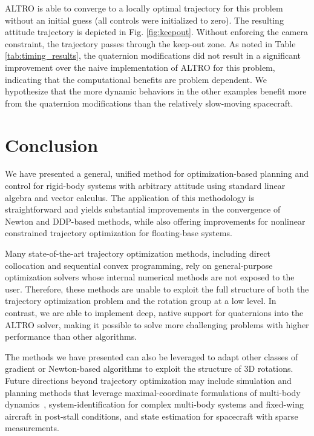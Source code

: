 \documentclass[../root.tex]{subfiles}
\begin{document}
        ALTRO is able to converge to a locally optimal trajectory for this
        problem without an initial guess (all controls were initialized to
        zero). The resulting attitude trajectory is depicted in Fig.
        \ref{fig:keepout}. Without enforcing the camera constraint, the
        trajectory passes through the keep-out zone. As noted in Table
        \ref{tab:timing_results}, the quaternion modifications did not result
        in a significant improvement over the naive implementation of ALTRO
        for this problem, indicating that the computational benefits are
        problem dependent. We hypothesize that the more dynamic behaviors in
        the other examples benefit more from the quaternion modifications
        than the relatively slow-moving spacecraft.
    

\section{Conclusion} \label{sec:attitude_conclusion}
    We have presented a general, unified method for optimization-based
    planning and control for rigid-body systems with arbitrary attitude using
    standard linear algebra and vector calculus. The application of this
    methodology is straightforward and yields substantial improvements in the
    convergence of Newton and DDP-based methods, while also offering
    improvements for nonlinear constrained trajectory optimization for
    floating-base systems.
    
    Many state-of-the-art trajectory optimization methods, including direct
    collocation and sequential convex programming, rely on general-purpose
    optimization solvers whose internal numerical methods are not exposed to
    the user. Therefore, these methods are unable to exploit the full
    structure of both the trajectory optimization problem and the rotation
    group at a low level. In contrast, we are able to implement deep, native
    support for quaternions into the ALTRO solver, making it possible to
    solve more challenging problems with higher performance than other
    algorithms.

    The methods we have presented can also
    be leveraged to adapt other classes of gradient or Newton-based
    algorithms to exploit the structure of 3D rotations. Future directions
    beyond trajectory optimization may include simulation and planning
    methods that leverage maximal-coordinate formulations of multi-body
    dynamics~\cite{brudigam_LinearTime_2020}, system-identification for complex
    multi-body systems and fixed-wing aircraft in post-stall conditions, and
    state estimation for spacecraft with sparse measurements.
\end{document}
